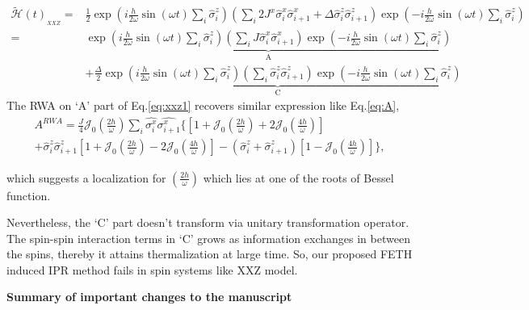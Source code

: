 \documentclass[aps,prb,reprint,showpacs,floatfix,superscriptaddress, onecolumn, nofootinbib, 9pt]{revtex4-2}
\begin{document}
\begin{enumerate}
{			\begin{align}
				\tilde{\mathcal{H}}(t)_{_{XXZ}}= & \frac{1}{2} \exp \left(i \frac{h}{2 \omega} \sin (\omega t) \sum_{i} \hat{\sigma}_{i}^{z}\right)\left(\sum_{i} 2J^x \hat{\sigma}^x_i \hat{\sigma}^x_{i+1} + \Delta  \hat{\sigma}^z_i \hat{\sigma}^z_{i+1}\right) \exp \left(-i \frac{h}{2 \omega} \sin (\omega t) \sum_i\hat{\sigma}_{i}^{z}\right) \nonumber\\
				= & \underbrace{\exp \left(i \frac{h}{2 \omega} \sin (\omega t) \sum_{i} \hat{\sigma}_{i}^{z}\right)\left(\sum_{i} J \hat{\sigma}_{i}^{x} \hat{\sigma}_{i+1}^{x}\right) \exp \left(-i \frac{h}{2 \omega} \sin (\omega t) \sum_i\hat{\sigma}_{i}^{z}\right)}_{\mathrm{A}} \nonumber\\
				& +\underbrace{\frac{\Delta}{2} \exp \left(i \frac{h}{2 \omega} \sin (\omega t) \sum_{i} \hat{\sigma}_{i}^{z}\right)\left(\sum_{i}  \hat{\sigma}_{i}^{z} \hat{\sigma}_{i+1}^{z}\right) \exp \left(-i \frac{h}{2 \omega} \sin (\omega t) \sum_i\hat{\sigma}_{i}^{z}\right)}_{\mathrm{C}}
				\label{eq:xxz1}
			\end{align}
			The RWA on `A' part of Eq.\eqref{eq:xxz1} recovers similar expression like  Eq.\eqref{eq:A},
			\begin{multline}
				A^{R W A}=\frac{J}{4}\mathcal{J}_0\left(\frac{2h}{\omega}\right)\sum_i \hat{\sigma^x_i} \hat{\sigma^x_{i+1}} \Bigg\{\left[1+\mathcal{J}_0\left(\frac{2h}{\omega}\right) + 2\mathcal{J}_0\left(\frac{4h}{\omega}\right)\right]\\ +\hat{\sigma}^z_i\hat{\sigma}^z_{i+1}\left[1+\mathcal{J}_0\left(\frac{2h}{\omega}\right)-2\mathcal{J}_0\left(\frac{4h}{\omega}\right)\right] -\left(\hat{\sigma}^z_i+\hat{\sigma}^z_{i+1}\right)\left[1-\mathcal{J}_0\left(\frac{4h}{\omega}\right)\right]\Bigg\},
			\end{multline}
			
			which suggests a localization for $\left(\frac{2h}{\omega}\right)$ which lies at one of the roots of Bessel function. 
			
			Nevertheless, the `C' part doesn't transform via unitary transformation operator. The spin-spin interaction terms in `C' grows as information exchanges in between the spins, thereby it attains thermalization at large time. So, our proposed FETH induced IPR method fails in spin systems like XXZ model.
		}
	\end{enumerate}
	\vskip 1cm 
	\noindent \textbf{Summary of important changes to the  manuscript}
	
\end{document}
